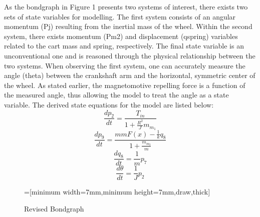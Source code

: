 \documentclass[notitlepage,10pt]{report}
\begin{document}
\begin{multicols}{2}
As the bondgraph in Figure 1 presents two systems of interest, there exists two sets of state variables for modelling. The first system consists of an angular momentum (Pj) resulting from the inertial mass of the wheel. Within the second system, there exists momentum (Pm2) and displacement (qspring) variables related to the cart mass and spring, respectively. The final state variable is an unconventional one and is reasoned through the physical relationship between the two systems. When observing the first system, one can accurately measure the angle (theta) between the crankshaft arm and the horizontal, symmetric center of the wheel. As stated earlier, the magnetomotive repelling force is a function of the measured angle, thus allowing the model to treat the angle as a state variable. The derived state equations for the model are listed below:
\begin{equation}
   \frac{dp_2}{dt} = \frac{T_{in}}{1 + \frac{R^2}{J}m_{m_{1}}}
\end{equation}
\begin{equation}
   \frac{dp_9}{dt} = \frac{mmF(x) - \frac{1}{k}q_8}{1 + \frac{m_{m_{2}}}{m}}
\end{equation}
\begin{equation}
   \frac{dq_8}{dt} = \frac{1}{m}p_7
\end{equation}
\begin{equation}
   \frac{d\theta}{dt} = \frac{1}{J}p_2
\end{equation}
\begin{figure*}
   \centering
   =[minimum width=7mm,minimum height=7mm,draw,thick]
    \caption{Revised Bondgraph}
\end{figure*}

\end{multicols}
\end{document}
